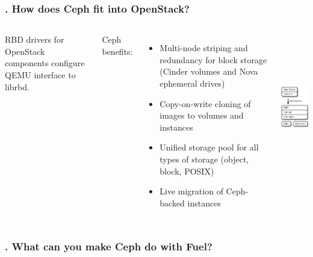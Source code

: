 \documentclass[hyperref=unicode,utf8,xcolor=pst]{beamer}
\begin{document}
\begin{frame}
	\frametitle{\insertframenumber{}. How does Ceph fit into
	OpenStack?}
	\begin{columns}
		RBD drivers for OpenStack components configure QEMU
		interface to librbd.

		\vspace{2ex}
		Ceph benefits:
		\begin{itemize}
			\item Multi-node striping and redundancy for
				block storage (Cinder volumes and Nova
				ephemeral drives)
			\item Copy-on-write cloning of images to
				volumes and instances
			\item Unified storage pool for all types of
				storage (object, block, POSIX)
			\item Live migration of Ceph-backed instances
		\end{itemize}

		\includegraphics[height=6.5cm]{ceph-rbd-openstack}
	\end{columns}
\end{frame}

\begin{frame}
	\frametitle{\insertframenumber{}. What can you make Ceph do with
	Fuel?}
\end{frame}
\end{document}
